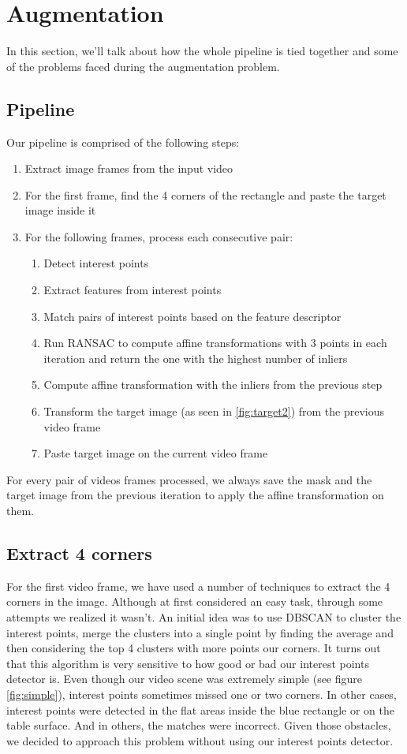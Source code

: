 \documentclass[]{IEEEtran}
\begin{document}
\section{Augmentation}
In this section, we'll talk about how the whole pipeline is tied together and some of the problems faced during the augmentation problem.

\subsection{Pipeline}
Our pipeline is comprised of the following steps:
\begin{enumerate}
\item Extract image frames from the input video
\item For the first frame, find the 4 corners of the rectangle and paste the target image inside it
\item For the following frames, process each consecutive pair:
\begin{enumerate}
\item Detect interest points
\item Extract features from interest points
\item Match pairs of interest points based on the feature descriptor
\item Run RANSAC to compute affine transformations with 3 points in each iteration and return the one with the highest number of inliers
\item Compute affine transformation with the inliers from the previous step
\item Transform the target image (as seen in \ref{fig:target2}) from the previous video frame
\item Paste target image on the current video frame
\end{enumerate}
\end{enumerate}

For every pair of videos frames processed, we always save the mask and the target image from the previous iteration to apply the affine transformation on them.

\subsection{Extract 4 corners}
For the first video frame, we have used a number of techniques to extract the 4 corners in the image. Although at first considered an easy task, through some attempts we realized it wasn't. An initial idea was to use DBSCAN to cluster the interest points, merge the clusters into a single point by finding the average and then considering the top 4 clusters with more points our corners. It turns out that this algorithm is very sensitive to how good or bad our interest points detector is. Even though our video scene was extremely simple (see figure \ref{fig:simple}), interest points sometimes missed one or two corners. In other cases, interest points were detected in the flat areas inside the blue rectangle or on the table surface. And in others, the matches were incorrect. Given those obstacles, we decided to approach this problem without using our interest points detector.
\end{document}
